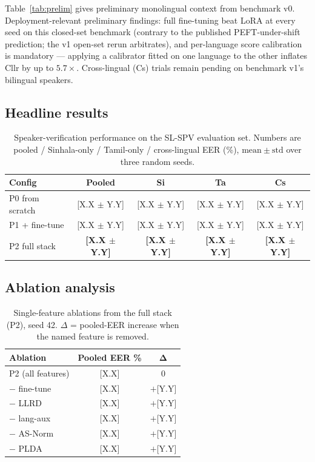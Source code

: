 \documentclass[11pt,a4paper]{article}
\begin{document}
Table~\ref{tab:prelim} gives preliminary monolingual context from
benchmark v0. Deployment-relevant preliminary findings: full
fine-tuning beat LoRA at every seed on this closed-set benchmark
(contrary to the published PEFT-under-shift prediction; the v1
open-set rerun arbitrates), and per-language score calibration is
mandatory --- applying a calibrator fitted on one language to the
other inflates Cllr by up to $5.7\times$. Cross-lingual (Cs) trials
remain pending on benchmark v1's bilingual speakers.

\subsection{Headline results}
\label{sec:exp:headline}

\begin{table}[t]
\centering
\caption{Speaker-verification performance on the SL-SPV evaluation set.
Numbers are pooled / Sinhala-only / Tamil-only / cross-lingual EER (\%),
$\mathrm{mean} \pm \mathrm{std}$ over three random seeds.}
\label{tab:headline}
\begin{tabular}{lcccc}
\toprule
\textbf{Config} & \textbf{Pooled} & \textbf{Si} & \textbf{Ta} & \textbf{Cs} \\
\midrule
P0 from scratch    & [X.X $\pm$ Y.Y] & [X.X $\pm$ Y.Y] & [X.X $\pm$ Y.Y] & [X.X $\pm$ Y.Y] \\
P1 + fine-tune     & [X.X $\pm$ Y.Y] & [X.X $\pm$ Y.Y] & [X.X $\pm$ Y.Y] & [X.X $\pm$ Y.Y] \\
P2 full stack      & \textbf{[X.X $\pm$ Y.Y]} & \textbf{[X.X $\pm$ Y.Y]}
                   & \textbf{[X.X $\pm$ Y.Y]} & \textbf{[X.X $\pm$ Y.Y]} \\
\bottomrule
\end{tabular}
\end{table}

\subsection{Ablation analysis}
\label{sec:exp:ablation}

\begin{table}[t]
\centering
\caption{Single-feature ablations from the full stack (P2), seed 42.
$\Delta$ = pooled-EER increase when the named feature is removed.}
\label{tab:ablation}
\begin{tabular}{lcc}
\toprule
\textbf{Ablation} & \textbf{Pooled EER \%} & $\boldsymbol{\Delta}$ \\
\midrule
P2 (all features)   & [X.X] & 0 \\
\midrule
$-$ fine-tune       & [X.X] & $+$[Y.Y] \\
$-$ LLRD            & [X.X] & $+$[Y.Y] \\
$-$ lang-aux        & [X.X] & $+$[Y.Y] \\
$-$ AS-Norm         & [X.X] & $+$[Y.Y] \\
$-$ PLDA            & [X.X] & $+$[Y.Y] \\
\bottomrule
\end{tabular}
\end{table}
\end{document}
